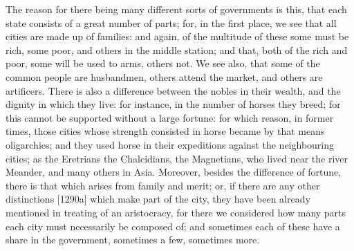 
The reason for there being many different sorts of governments is this,
that each state consists of a great number of parts; for, in the first
place, we see that all cities are made up of families: and again, of the
multitude of these some must be rich, some poor, and others in the middle
station; and that, both of the rich and poor, some will be used to arms,
others not. We see also, that some of the common people are husbandmen,
others attend the market, and others are artificers. There is also a
difference between the nobles in their wealth, and the dignity in which
they live: for instance, in the number of horses they breed; for this
cannot be supported without a large fortune: for which reason, in former
times, those cities whose strength consisted in horse became by that means
oligarchies; and they used horse in their expeditions against the
neighbouring cities; as the Eretrians the Chalcidians, the Magnetians, who
lived near the river Meander, and many others in Asia. Moreover, besides
the difference of fortune, there is that which arises from family and
merit; or, if there are any other distinctions [1290a] which make part of
the city, they have been already mentioned in treating of an aristocracy,
for there we considered how many parts each city must necessarily be
composed of; and sometimes each of these have a share in the government,
sometimes a few, sometimes more.

